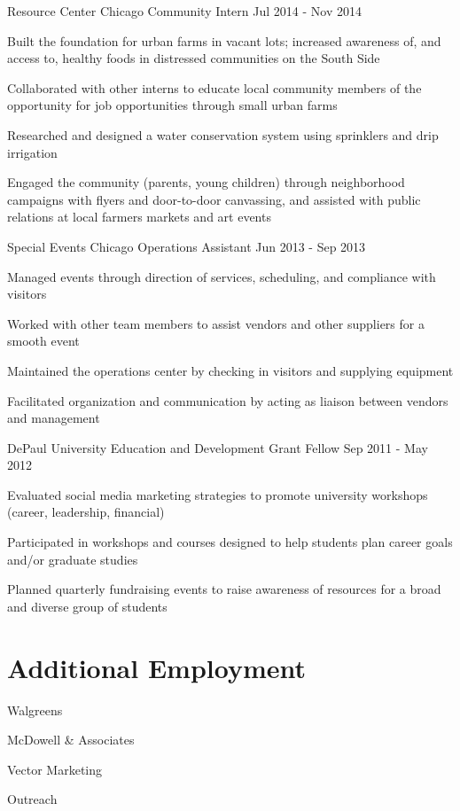 \documentclass{../styles/cv}
\begin{document}
\subsectionpositiondate
    {Resource Center Chicago}
    {Community Intern}
    {Jul 2014 - Nov 2014}
\resumesublistbegin
    \item Built the foundation for urban farms in vacant lots; increased awareness of, and access to, healthy foods in distressed communities on the South Side
    \item Collaborated with other interns to educate local community members of the opportunity for job opportunities through small urban farms
    \item Researched and designed a water conservation system using sprinklers and drip irrigation
    \item Engaged the community (parents, young children) through neighborhood campaigns with flyers and door-to-door canvassing, and assisted with public relations at local farmers markets and art events
\resumesublistend

\subsectionpositiondate
    {Special Events Chicago}
    {Operations Assistant}
    {Jun 2013 - Sep 2013}
\resumesublistbegin
    \item Managed events through direction of services, scheduling, and compliance with visitors
    \item Worked with other team members to assist vendors and other suppliers for a smooth event
    \item Maintained the operations center by checking in visitors and supplying equipment
    \item Facilitated organization and communication by acting as liaison between vendors and management
\resumesublistend

\subsectionpositiondate
    {DePaul University}
    {Education and Development Grant Fellow}
    {Sep 2011 - May 2012}
\resumesublistbegin
    \item Evaluated social media marketing strategies to promote university workshops (career, leadership, financial)
    \item Participated in workshops and courses designed to help students plan career goals and/or graduate studies
    \item Planned quarterly fundraising events to raise awareness of resources for a broad and diverse group of students
\resumesublistend

\section{Additional Employment}
\resumesublistbegin
    \item Walgreens
    \item McDowell \& Associates
    \item Vector Marketing
    \item Outreach
\resumesublistend
\end{document}
